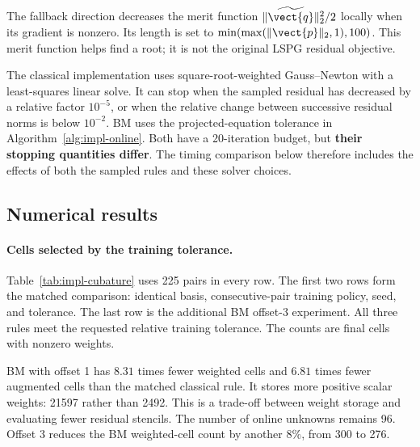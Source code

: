 The fallback direction decreases the merit function $\|\widetilde{\vect{q}}\|_2^2/2$ locally when its gradient is nonzero. Its length is set to $\min(\max(\|\vect{p}\|_2,1),100)$. This merit function helps find a root; it is not the original LSPG residual objective.

The classical implementation uses square-root-weighted Gauss--Newton with a least-squares linear solve. It can stop when the sampled residual has decreased by a relative factor $10^{-5}$, or when the relative change between successive residual norms is below $10^{-2}$. BM uses the projected-equation tolerance in Algorithm~\ref{alg:impl-online}. Both have a 20-iteration budget, but \textbf{their stopping quantities differ}. The timing comparison below therefore includes the effects of both the sampled rules and these solver choices.

\subsection{Numerical results}
\label{sec:impl-results}

\paragraph{Cells selected by the training tolerance.}
Table~\ref{tab:impl-cubature} uses 225 pairs in every row. The first two rows form the matched comparison: identical basis, consecutive-pair training policy, seed, and tolerance. The last row is the additional BM offset-3 experiment. All three rules meet the requested relative training tolerance. The counts are final cells with nonzero weights.

\begin{table}[H]
 \centering\small
 
 \caption{Trained rules with 96 modes and 225 pairs. ``Augmented'' includes stencil support. ``Weight entries'' counts strictly positive scalar weights. Training error is the relative norm in Equation~\eqref{eq:impl-tolerance}.}
 \label{tab:impl-cubature}
\end{table}

BM with offset 1 has $8.31$ times fewer weighted cells and $6.81$ times fewer augmented cells than the matched classical rule. It stores more positive scalar weights: 21597 rather than 2492. This is a trade-off between weight storage and evaluating fewer residual stencils. The number of online unknowns remains 96. Offset 3 reduces the BM weighted-cell count by another $8\%$, from 300 to 276.

